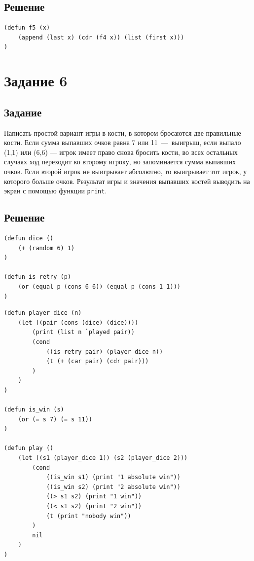 \subsection*{Решение}
\begin{code}
\begin{verbatim}
(defun f5 (x)
	(append (last x) (cdr (f4 x)) (list (first x)))
)
\end{verbatim}
\end{code}


\section{Задание 6}
\subsection*{Задание}
Написать простой вариант игры в кости, в котором бросаются две правильные кости. Если сумма выпавших очков равна 7 или 11~---~выигрыш, если выпало (1,1) или (6,6) — игрок имеет право снова бросить кости, во всех остальных случаях ход переходит ко второму игроку, но запоминается сумма выпавших очков. Если второй игрок не выигрывает абсолютно, то выигрывает тот игрок, у которого больше очков. Результат игры и значения выпавших костей выводить на экран с помощью функции \texttt{print}.

\subsection*{Решение}
\begin{code}
\begin{verbatim}
(defun dice ()
	(+ (random 6) 1)
)

(defun is_retry (p)
	(or (equal p (cons 6 6)) (equal p (cons 1 1)))
)
\end{verbatim}
\end{code}

\newpage

\begin{code}
\begin{verbatim}
(defun player_dice (n) 
	(let ((pair (cons (dice) (dice)))) 
		(print (list n `played pair))
		(cond
			((is_retry pair) (player_dice n))
			(t (+ (car pair) (cdr pair)))
		)
	)
)

(defun is_win (s)
	(or (= s 7) (= s 11))
)

(defun play ()
	(let ((s1 (player_dice 1)) (s2 (player_dice 2)))
		(cond
			((is_win s1) (print "1 absolute win"))
			((is_win s2) (print "2 absolute win"))
			((> s1 s2) (print "1 win"))
			((< s1 s2) (print "2 win"))
			(t (print "nobody win"))
		)
		nil
	)
)
\end{verbatim}
\end{code}


